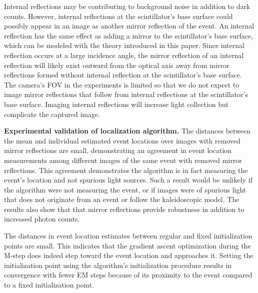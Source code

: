Internal reflections may be contributing to background noise in addition to dark counts.
However, internal reflections at the scintillator's base surface could possibly 
appear in an image as another mirror reflection of the event.
An internal reflection has the same effect as adding a mirror to the 
scintillator's base surface, which can be modeled with the theory introduced in 
this paper.
Since internal reflection occurs at a large incidence angle, the 
mirror reflection of an internal reflection will likely exist 
outward from the optical axis away from mirror reflections formed 
without internal reflection at the scintillator's base surface. 
The camera's FOV in the experiments is limited so that we do not 
expect to image mirror reflections that follow from internal reflections at the 
scintillator's base surface.
Imaging internal reflections will increase light collection but complicate the 
captured image.

\noindent
\textbf{Experimental validation of localization algorithm.}
The distances between the mean and individual estimated event locations over 
images with removed mirror reflections are small, demonstrating an agreement in 
event location measurements among different images of the same event with removed 
mirror reflections.
This agreement demonstrates the algorithm is in fact measuring the event's 
location and not spurious light sources.
Such a result would be unlikely if the algorithm were not measuring the event, or 
if images were of spurious light that does not originate from an event or follow 
the kaleidoscopic model.
The results also show that that mirror reflections provide robustness in 
addition to increased photon counts.

The distances in event location estimates between regular and fixed 
initialization points are small.
This indicates that the gradient ascent optimization during the M-step does indeed 
step toward the event location and approaches it.
Setting the initialization point using the algorithm's initialization procedure 
results in convergence with fewer EM steps because of its proximity to the event 
compared to a fixed initialization point. 

